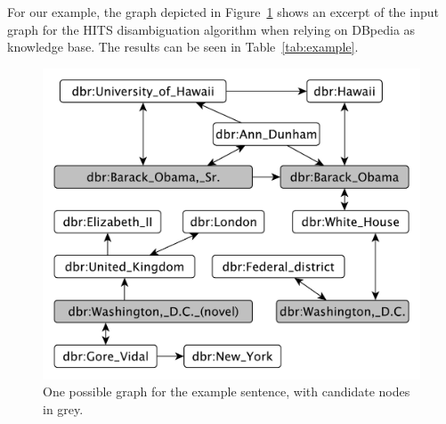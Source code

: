 For our example, the graph depicted in Figure~\ref{fig:example} shows an excerpt of the input graph for the  \ac{HITS} disambiguation algorithm when relying on DBpedia as knowledge base. 
The results can be seen in Table~\ref{tab:example}. 

\begin{figure}[htbp]
	\begin{minipage}[b]{0.57\textwidth} 
         \centering
        \includegraphics[width=\linewidth]{part_02/unstructured_annotation/fig/exampleGraph.pdf}
        \caption{One possible graph for the example sentence, with candidate nodes in grey.}
        \label{fig:example}
    \end{minipage}
	\hfill
	\begin{minipage}[b]{0.42\textwidth}
        \centering
\end{minipage}
\end{figure}
